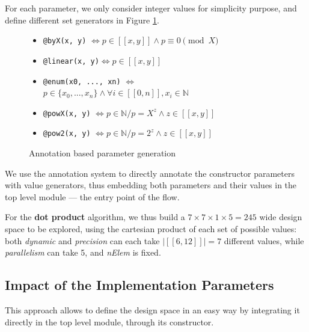         For each parameter, we only consider integer values for simplicity purpose, and define different set generators in Figure \ref{ch.dse:sec.explorable:ssec.generators:fig.annotations}.
        \begin{figure}[ht!]
            \centering
            \begin{itemize}
                \item \lstinline{@byX(x, y)} $\Leftrightarrow$\hspace*{\fill}$p \in [\![x, y]\!] \land p \equiv 0 \pmod X$
                \item \lstinline{@linear(x, y)}\footnotemark$\Leftrightarrow$\hspace*{\fill}$p \in [\![x, y]\!]$
                \item \lstinline{@enum(x0, ..., xn)} $\Leftrightarrow$ \hspace*{\fill} $p \in \{x_0, ..., x_n\} \land \forall i \in [\![0, n]\!], x_i \in \mathbb{N}$
                \item \lstinline{@powX(x, y)} $\Leftrightarrow$\hspace*{\fill}$p \in \mathbb{N}/p = X^z \land z \in [\![x, y]\!]$
                \item \lstinline{@pow2(x, y)} $\Leftrightarrow$\hspace*{\fill}$p \in \mathbb{N}/p = 2^z \land z \in [\![x, y]\!]$
            \end{itemize}
            \caption{Annotation based parameter generation}
            \label{ch.dse:sec.explorable:ssec.generators:fig.annotations}
        \end{figure}

        We use the \scala{} annotation system to directly annotate the constructor parameters with value generators, thus embedding both parameters and their values in the top level module --- \ie the entry point of the \chisel{} flow.

        For the {\bf dot product} algorithm, we thus build a $7 \times 7 \times 1 \times 5 = 245$ wide design space to be explored, using the cartesian product of each set of possible values: both {\it dynamic} and {\it precision} can each take $|[\![6, 12]\!]| = 7$ different values, while {\it parallelism} can take 5, and {\it nElem} is fixed.

    \subsection{Impact of the Implementation Parameters}
    \label{ch.dse:sec.explorable:ssec.impact}
        This approach allows to define the design space in an easy way by integrating it directly in the top level module, through its constructor.

